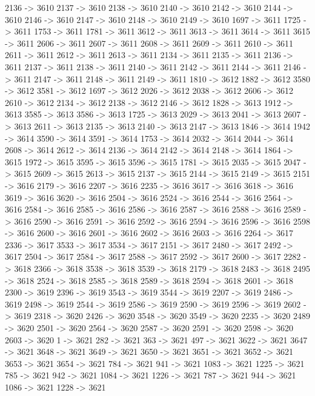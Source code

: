 {	2136 -> 3610
	2137 -> 3610
	2138 -> 3610
	2140 -> 3610
	2142 -> 3610
	2144 -> 3610
	2146 -> 3610
	2147 -> 3610
	2148 -> 3610
	2149 -> 3610
	1697 -> 3611
	1725 -> 3611
	1753 -> 3611
	1781 -> 3611
	3612 -> 3611
	3613 -> 3611
	3614 -> 3611
	3615 -> 3611
	2606 -> 3611
	2607 -> 3611
	2608 -> 3611
	2609 -> 3611
	2610 -> 3611
	2611 -> 3611
	2612 -> 3611
	2613 -> 3611
	2134 -> 3611
	2135 -> 3611
	2136 -> 3611
	2137 -> 3611
	2138 -> 3611
	2140 -> 3611
	2142 -> 3611
	2144 -> 3611
	2146 -> 3611
	2147 -> 3611
	2148 -> 3611
	2149 -> 3611
	1810 -> 3612
	1882 -> 3612
	3580 -> 3612
	3581 -> 3612
	1697 -> 3612
	2026 -> 3612
	2038 -> 3612
	2606 -> 3612
	2610 -> 3612
	2134 -> 3612
	2138 -> 3612
	2146 -> 3612
	1828 -> 3613
	1912 -> 3613
	3585 -> 3613
	3586 -> 3613
	1725 -> 3613
	2029 -> 3613
	2041 -> 3613
	2607 -> 3613
	2611 -> 3613
	2135 -> 3613
	2140 -> 3613
	2147 -> 3613
	1846 -> 3614
	1942 -> 3614
	3590 -> 3614
	3591 -> 3614
	1753 -> 3614
	2032 -> 3614
	2044 -> 3614
	2608 -> 3614
	2612 -> 3614
	2136 -> 3614
	2142 -> 3614
	2148 -> 3614
	1864 -> 3615
	1972 -> 3615
	3595 -> 3615
	3596 -> 3615
	1781 -> 3615
	2035 -> 3615
	2047 -> 3615
	2609 -> 3615
	2613 -> 3615
	2137 -> 3615
	2144 -> 3615
	2149 -> 3615
	2151 -> 3616
	2179 -> 3616
	2207 -> 3616
	2235 -> 3616
	3617 -> 3616
	3618 -> 3616
	3619 -> 3616
	3620 -> 3616
	2504 -> 3616
	2524 -> 3616
	2544 -> 3616
	2564 -> 3616
	2584 -> 3616
	2585 -> 3616
	2586 -> 3616
	2587 -> 3616
	2588 -> 3616
	2589 -> 3616
	2590 -> 3616
	2591 -> 3616
	2592 -> 3616
	2594 -> 3616
	2596 -> 3616
	2598 -> 3616
	2600 -> 3616
	2601 -> 3616
	2602 -> 3616
	2603 -> 3616
	2264 -> 3617
	2336 -> 3617
	3533 -> 3617
	3534 -> 3617
	2151 -> 3617
	2480 -> 3617
	2492 -> 3617
	2504 -> 3617
	2584 -> 3617
	2588 -> 3617
	2592 -> 3617
	2600 -> 3617
	2282 -> 3618
	2366 -> 3618
	3538 -> 3618
	3539 -> 3618
	2179 -> 3618
	2483 -> 3618
	2495 -> 3618
	2524 -> 3618
	2585 -> 3618
	2589 -> 3618
	2594 -> 3618
	2601 -> 3618
	2300 -> 3619
	2396 -> 3619
	3543 -> 3619
	3544 -> 3619
	2207 -> 3619
	2486 -> 3619
	2498 -> 3619
	2544 -> 3619
	2586 -> 3619
	2590 -> 3619
	2596 -> 3619
	2602 -> 3619
	2318 -> 3620
	2426 -> 3620
	3548 -> 3620
	3549 -> 3620
	2235 -> 3620
	2489 -> 3620
	2501 -> 3620
	2564 -> 3620
	2587 -> 3620
	2591 -> 3620
	2598 -> 3620
	2603 -> 3620
	1 -> 3621
	282 -> 3621
	363 -> 3621
	497 -> 3621
	3622 -> 3621
	3647 -> 3621
	3648 -> 3621
	3649 -> 3621
	3650 -> 3621
	3651 -> 3621
	3652 -> 3621
	3653 -> 3621
	3654 -> 3621
	784 -> 3621
	941 -> 3621
	1083 -> 3621
	1225 -> 3621
	785 -> 3621
	942 -> 3621
	1084 -> 3621
	1226 -> 3621
	787 -> 3621
	944 -> 3621
	1086 -> 3621
	1228 -> 3621
}
